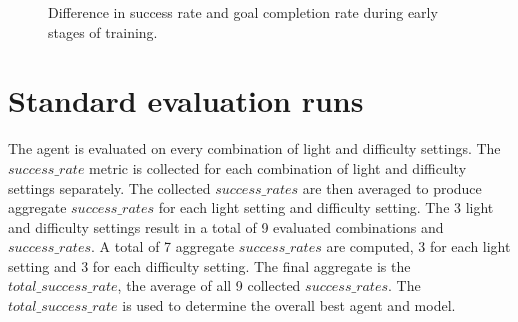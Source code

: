 \begin{figure}
    \centering
    \caption{Difference in success rate and goal completion rate during early stages of training.}
    \label{fig:success_rate_vs_goal_completion_rate}
\end{figure}


\section{Standard evaluation runs}

The agent is evaluated on every combination of light and difficulty settings. The $success\_rate$ metric is collected for each combination of light and difficulty settings separately. The collected $success\_rates$ are then averaged to produce aggregate $success\_rates$ for each light setting and difficulty setting. The 3 light and difficulty settings result in a total of 9 evaluated combinations and $success\_rates$. A total of 7 aggregate $success\_rates$ are computed, 3 for each light setting and 3 for each difficulty setting. The final aggregate is the $total\_success\_rate$, the average of all 9 collected $success\_rates$. 
The $total\_success\_rate$ is used to determine the overall best agent and model.


